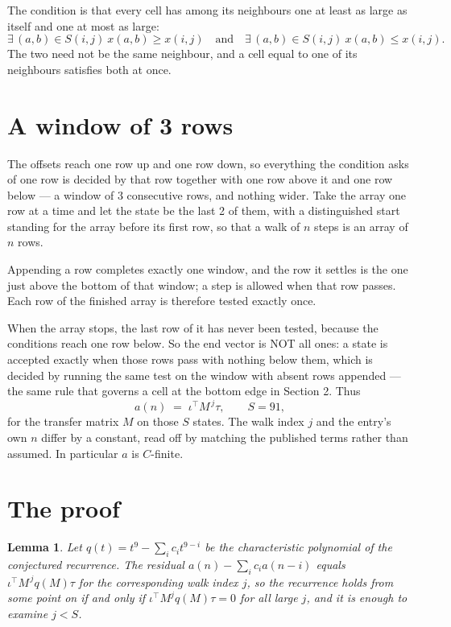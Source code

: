 \documentclass[11pt,a4paper]{article}
\theoremstyle{plain}
\newtheorem{lemma}[theorem]{Lemma}
\theoremstyle{definition}
\begin{document}
The condition is that every cell has among its neighbours one at least as large as itself and one at most as large:
\[
\exists\,(a,b)\in S(i,j)\ x(a,b)\ge x(i,j)\quad\text{and}\quad\exists\,(a,b)\in S(i,j)\ x(a,b)\le x(i,j).
\]
The two need not be the same neighbour, and a cell equal to one of its neighbours satisfies both at once.

\section{A window of 3 rows}

The offsets reach one row up and one row down, so everything the condition asks of one row is
decided by that row together with one row above it and one row below --- a window of
$3$ consecutive rows, and nothing wider. Take the array one row at a time and
let the state be the last 2 of them, with a distinguished start standing for the array before its
first row, so that a walk of $n$ steps is an array of $n$ rows.

Appending a row completes exactly one window, and the row it settles is the one just above the bottom of that window; a step is
allowed when that row passes. Each row of the finished array is therefore tested exactly once.

When the array stops, the last row of it has never been tested, because the
conditions reach one row below. So the end vector is NOT all ones: a state is accepted exactly when
those rows pass with nothing below them, which is decided by running the same test on the window
with absent rows appended --- the same rule that governs a cell at the bottom edge in
Section 2.
Thus
\[
a(n)\;=\;\iota^{\!\top}M^{\,j}\tau ,\qquad S=91,
\]
for the transfer matrix $M$ on those $S$ states. The walk index $j$ and the entry's own $n$
differ by a constant, read off by matching the published terms rather than assumed. In
particular $a$ is $C$-finite.

\section{The proof}

\begin{lemma}\label{lem:crit}
Let $q(t)=t^{9}-\sum_i c_it^{9-i}$ be the characteristic polynomial of the
conjectured recurrence. The residual $a(n)-\sum_ic_ia(n-i)$ equals
$\iota^{\!\top}M^{\,j}q(M)\tau$ for the corresponding walk index $j$, so the recurrence
holds from some point on if and only if $\iota^{\!\top}M^{j}q(M)\tau=0$ for all large $j$,
and it is enough to examine $j<S$.
\end{lemma}
\end{document}
